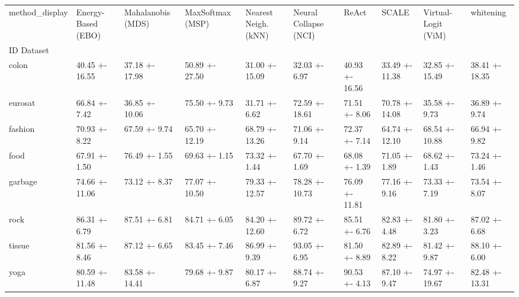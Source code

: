 \begin{tabular}{llllllllll}
\toprule
method_display & Energy-Based (EBO) & Mahalanobis (MDS) & MaxSoftmax (MSP) & Nearest Neigh. (kNN) & Neural Collapse (NCI) & ReAct & SCALE & Virtual-Logit (ViM) & whitening \\
ID Dataset &  &  &  &  &  &  &  &  &  \\
\midrule
colon & 40.45 +- 16.55 & 37.18 +- 17.98 & 50.89 +- 27.50 & 31.00 +- 15.09 & 32.03 +- 6.97 & 40.93 +- 16.56 & 33.49 +- 11.38 & 32.85 +- 15.49 & 38.41 +- 18.35 \\
eurosat & 66.84 +- 7.42 & 36.85 +- 10.06 & 75.50 +- 9.73 & 31.71 +- 6.62 & 72.59 +- 18.61 & 71.51 +- 8.06 & 70.78 +- 14.08 & 35.58 +- 9.73 & 36.89 +- 9.74 \\
fashion & 70.93 +- 8.22 & 67.59 +- 9.74 & 65.70 +- 12.19 & 68.79 +- 13.26 & 71.06 +- 9.14 & 72.37 +- 7.14 & 64.74 +- 12.10 & 68.54 +- 10.88 & 66.94 +- 9.82 \\
food & 67.91 +- 1.50 & 76.49 +- 1.55 & 69.63 +- 1.15 & 73.32 +- 1.44 & 67.70 +- 1.69 & 68.08 +- 1.39 & 71.05 +- 1.89 & 68.62 +- 1.43 & 73.24 +- 1.46 \\
garbage & 74.66 +- 11.06 & 73.12 +- 8.37 & 77.07 +- 10.50 & 79.33 +- 12.57 & 78.28 +- 10.73 & 76.09 +- 11.81 & 77.16 +- 9.16 & 73.33 +- 7.19 & 73.54 +- 8.07 \\
rock & 86.31 +- 6.79 & 87.51 +- 6.81 & 84.71 +- 6.05 & 84.20 +- 12.60 & 89.72 +- 6.72 & 85.51 +- 6.76 & 82.83 +- 4.48 & 81.80 +- 3.23 & 87.02 +- 6.68 \\
tissue & 81.56 +- 8.46 & 87.12 +- 6.65 & 83.45 +- 7.46 & 86.99 +- 9.39 & 93.05 +- 6.95 & 81.50 +- 8.89 & 82.89 +- 8.22 & 81.42 +- 9.87 & 88.10 +- 6.00 \\
yoga & 80.59 +- 11.48 & 83.58 +- 14.41 & 79.68 +- 9.87 & 80.17 +- 6.87 & 88.74 +- 9.27 & 90.53 +- 4.13 & 87.10 +- 9.47 & 74.97 +- 19.67 & 82.48 +- 13.31 \\
\bottomrule
\end{tabular}
